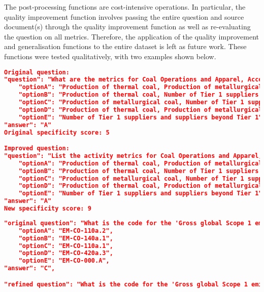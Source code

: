 The post-processing functions are cost-intensive operations. In particular, the quality improvement function involves passing the entire question and source document(s) through the quality improvement function as well as re-evaluating the question on all metrics. Therefore, the application of the quality improvement and generalisation functions to the entire dataset is left as future work. These functions were tested qualitatively, with two examples shown below.
\newpage
\begin{lstlisting}[language=JSON,firstnumber=1,label={lst:quality_improvement},caption={Application of quality improvement post-processing on a cross-industry MCQ}]
Original question:
"question": "What are the metrics for Coal Operations and Apparel, Accessories & Footwear industries.",
    "optionA": "Production of thermal coal, Production of metallurgical coal, Number of Tier 1 suppliers and suppliers beyond Tier 1",
    "optionB": "Production of thermal coal, Number of Tier 1 suppliers and suppliers beyond Tier 1",
    "optionC": "Production of metallurgical coal, Number of Tier 1 suppliers and suppliers beyond Tier 1",
    "optionD": "Production of thermal coal, Production of metallurgical coal",
    "optionE": "Number of Tier 1 suppliers and suppliers beyond Tier 1",
"answer": "A"
Original specificity score: 5

Improved question:
"question": "List the activity metrics for Coal Operations and Apparel, Accessories & Footwear industries.",
    "optionA": "Production of thermal coal, Production of metallurgical coal, Number of Tier 1 suppliers and suppliers beyond Tier 1",
    "optionB": "Production of thermal coal, Number of Tier 1 suppliers and suppliers beyond Tier 1",
    "optionC": "Production of metallurgical coal, Number of Tier 1 suppliers and suppliers beyond Tier 1",
    "optionD": "Production of thermal coal, Production of metallurgical coal",
    "optionE": "Number of Tier 1 suppliers and suppliers beyond Tier 1",
"answer": "A"
New specificity score: 9
\end{lstlisting}

\begin{lstlisting}[language=JSON,firstnumber=1,label={lst:generalisation_example},caption={Application of generalisation post-processing on a cross-industry MCQ}]
"original question": "What is the code for the 'Gross global Scope 1 emissions, percentage covered under emissions-limiting regulations' metric in the Coal Operations industry?",
    "optionA": "EM-CO-110a.2",
    "optionB": "EM-CO-140a.1",
    "optionC": "EM-CO-110a.1",
    "optionD": "EM-CO-420a.3",
    "optionE": "EM-CO-000.A",
"answer": "C",

"refined question": "What is the code for the 'Gross global Scope 1 emissions, percentage covered under emissions-limiting regulations' metric in the fossil fuel operations industry?"
\end{lstlisting}

